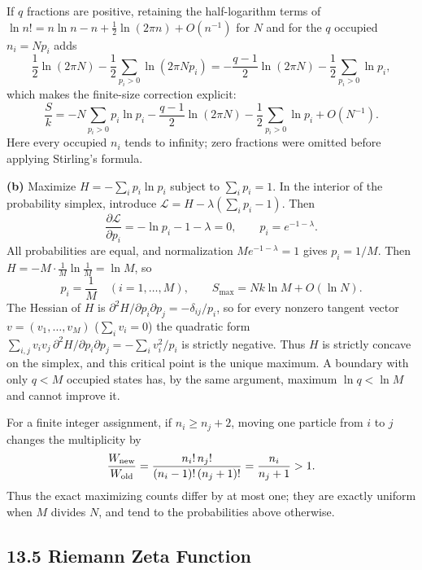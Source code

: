 If $q$ fractions are positive, retaining the half-logarithm terms
of $\ln n!=n\ln n-n+\frac12\ln(2\pi n)+O(n^{-1})$ for $N$ and for
the $q$ occupied $n_i=Np_i$ adds
\[
\frac12\ln(2\pi N)-\frac12\sum_{p_i>0}\ln(2\pi Np_i)
=-\frac{q-1}{2}\ln(2\pi N)-\frac12\sum_{p_i>0}\ln p_i,
\]
which makes the finite-size correction explicit:
\[
\frac Sk=-N\sum_{p_i>0}p_i\ln p_i
-\frac{q-1}{2}\ln(2\pi N)-\frac12\sum_{p_i>0}\ln p_i
+O(N^{-1}).
\]
Here every occupied $n_i$ tends to infinity; zero fractions were
omitted before applying Stirling's formula.

\textbf{(b)} Maximize $H=-\sum_i p_i\ln p_i$ subject to
$\sum_i p_i=1$.  In the interior of the probability simplex,
introduce $\mathcal L=H-\lambda(\sum_i p_i-1)$.  Then
\[
\frac{\partial\mathcal L}{\partial p_i}
=-\ln p_i-1-\lambda=0,
\qquad p_i=e^{-1-\lambda}.
\]
All probabilities are equal, and normalization
$Me^{-1-\lambda}=1$ gives $p_i=1/M$.  Then
$H=-M\cdot\frac1M\ln\frac1M=\ln M$, so
\[
\boxed{p_i=\frac1M\quad(i=1,\ldots,M)},\qquad
\boxed{S_{\max}=Nk\ln M+O(\ln N)}.
\]
The Hessian of $H$ is
$\partial^2H/\partial p_i\partial p_j=-\delta_{ij}/p_i$, so for
every nonzero tangent vector $v=(v_1,\ldots,v_M)$ ($\sum_iv_i=0$)
the quadratic form
$\sum_{i,j}v_iv_j\,\partial^2H/\partial p_i\partial p_j=-\sum_iv_i^2/p_i$
is strictly negative.
Thus $H$ is strictly concave on the simplex, and this critical
point is the unique maximum.  A boundary with only $q<M$ occupied
states has, by the same argument, maximum $\ln q<\ln M$ and cannot
improve it.

For a finite integer assignment, if $n_i\ge n_j+2$, moving one
particle from $i$ to $j$ changes the multiplicity by
\[
\frac{W_{\rm new}}{W_{\rm old}}
=\frac{n_i!\,n_j!}{(n_i-1)!\,(n_j+1)!}
=\frac{n_i}{n_j+1}>1.
\]
Thus the exact
maximizing counts differ by at most one; they are exactly uniform
when $M$ divides $N$, and tend to the probabilities above otherwise.


\subsection*{13.5 Riemann Zeta Function}

